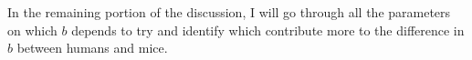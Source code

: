 %
%
In the remaining portion of the discussion, I will go through all the parameters on which $b$ depends to try and identify which contribute more to the difference in $b$ between humans and mice.



